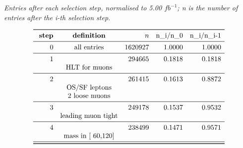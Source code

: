 \documentclass[11pt,a4paper]{article}
\begin{document}
\begin{table}
\caption{\emph{Entries after each selection step, normalised to 5.00 $fb^{-1}$; n is the number of entries after the i-th selection step.}}
\[
\begin{array}{rcrrr}
\toprule
\ \textbf{step}& \textbf{definition}  & n  & $n\_i/n\_0$ & $n\_i/n\_{i-1}$ \\ 
\midrule
 0  & \text{all entries} & 1620927 & 1.0000 & 1.0000 \\
\midrule
 1  & & 294665 & 0.1818 & 0.1818 \\
& \text{HLT for muons} & & & \\
\midrule
 2  & & 261415 & 0.1613 & 0.8872 \\
& \text{OS/SF leptons} & & & \\
& \text{2 loose muons} & & & \\
\midrule
 3  & & 249178 & 0.1537 & 0.9532 \\
& \text{leading muon tight} & & & \\
\midrule
 4  & & 238499 & 0.1471 & 0.9571 \\
& \text{mass in [ 60,120]} & & & \\
\midrule
\bottomrule
\end{array}
\]
\end{table}
\end{document}
